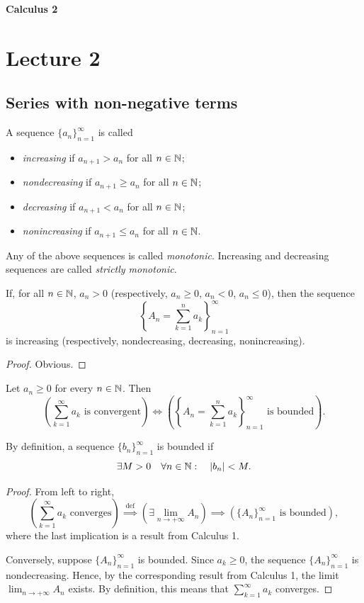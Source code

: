 
{\large\bfseries Calculus 2}

\section{Lecture 2}
\subsection*{Series with non-negative terms}

\begin{definition}\label{def:2.1}
A sequence $\{a_n\}_{n=1}^{\infty}$ is called
\begin{itemize}
\item \emph{increasing} if $a_{n+1}>a_n$ for all $n\in\mathbb{N}$;
\item \emph{nondecreasing} if $a_{n+1}\ge a_n$ for all $n\in\mathbb{N}$;
\item \emph{decreasing} if $a_{n+1}<a_n$ for all $n\in\mathbb{N}$;
\item \emph{nonincreasing} if $a_{n+1}\le a_n$ for all $n\in\mathbb{N}$.
\end{itemize}
Any of the above sequences is called \emph{monotonic}. Increasing and decreasing sequences are called \emph{strictly monotonic}.
\end{definition}

\begin{claim}\label{claim:2.1}
If, for all $n\in\mathbb{N}$, $a_n>0$ (respectively, $a_n\ge0$, $a_n<0$, $a_n\le0$), then the sequence
\[
\left\{A_n=\sum_{k=1}^{n}a_k\right\}_{n=1}^{\infty}
\]
is increasing (respectively, nondecreasing, decreasing, nonincreasing).
\end{claim}

\begin{proof}
Obvious.
\end{proof}

\begin{claim}\label{claim:2.2}
Let $a_n\ge0$ for every $n\in\mathbb{N}$. Then
\[
\left(\sum_{k=1}^{\infty}a_k\text{ is convergent}\right)
\iff
\left(\left\{A_n=\sum_{k=1}^{n}a_k\right\}_{n=1}^{\infty}\text{ is bounded}\right).
\]
\end{claim}

\noindent By definition, a sequence $\{b_n\}_{n=1}^{\infty}$ is bounded if
\[
\exists M>0\quad \forall n\in\mathbb{N}:\quad |b_n|<M.
\]

\begin{proof}
From left to right,
\[
\left(\sum_{k=1}^{\infty}a_k\text{ converges}\right)
\overset{\mathrm{def}}{\implies}
\left(\exists\lim_{n\to+\infty}A_n\right)
\implies
\left(\{A_n\}_{n=1}^{\infty}\text{ is bounded}\right),
\]
where the last implication is a result from Calculus 1.

Conversely, suppose $\{A_n\}_{n=1}^{\infty}$ is bounded. Since $a_k\ge0$, the sequence $\{A_n\}_{n=1}^{\infty}$ is nondecreasing. Hence, by the corresponding result from Calculus 1, the limit $\lim_{n\to+\infty}A_n$ exists. By definition, this means that $\sum_{k=1}^{\infty}a_k$ converges.
\end{proof}

